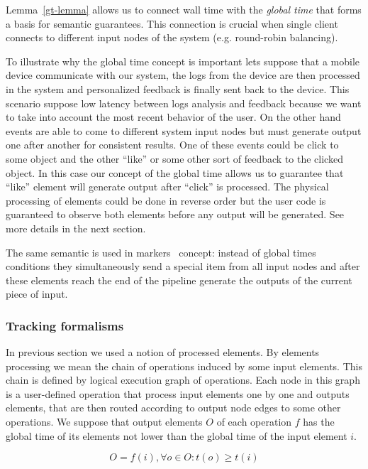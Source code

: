 Lemma~\ref{gt-lemma} allows us to connect wall time with the \textit{global time} that forms a basis for semantic guarantees. This connection is crucial when single client connects to different input nodes of the system (e.g. round-robin balancing).

To illustrate why the global time concept is important lets suppose that a mobile device communicate with our system, the logs from the device are then processed in the system and personalized feedback is finally sent back to the device. This scenario suppose low latency between logs analysis and feedback because we want to take into account the most recent behavior of the user. On the other hand events are able to come to different system input nodes but must generate output one after another for consistent results. One of these events could be click to some object and the other ``like'' or some other sort of feedback to the clicked object. In this case our concept of the global time allows us to guarantee that ``like'' element will generate output after ``click'' is processed. The physical processing of elements could be done in reverse order but the user code is guaranteed to observe both elements before any output will be generated. See more details in the next section.

The same semantic is used in markers~\cite{Carbone:2017:SMA:3137765.3137777} concept: instead of global times conditions they simultaneously send a special item from all input nodes and after these elements reach the end of the pipeline generate the outputs of the current piece of input.

\subsubsection{Tracking formalisms}
In previous section we used a notion of processed elements. By elements processing we mean the chain of operations induced by some input elements. This chain is defined by logical execution graph of operations. Each node in this graph is a user-defined operation that process input elements one by one and outputs elements, that are then routed according to output node edges to some other operations. We suppose that output elements $O$ of each operation $f$ has the global time of its elements not lower than the global time of the input element $i$.

\begin{equation}
    O = f(i), \forall o \in O: t(o) \ge t(i)
\end{equation}

